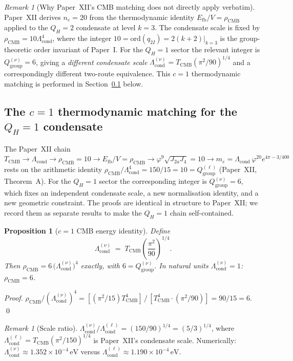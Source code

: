 \documentclass[11pt,a4paper]{article}
\newtheorem{proposition}[theorem]{Proposition}
\theoremstyle{definition}\newtheorem{definition}[theorem]{Definition}
\theoremstyle{remark}
\newtheorem{remark}[theorem]{Remark}
\newcommand{\vp}{\varphi}
\newcommand{\Ja}{J_{2a}}
\newcommand{\Jfour}{J_4}
\newcommand{\TCMB}{T_{\mathrm{CMB}}}
\newcommand{\Lcond}{\Lambda_{\mathrm{cond}}}
\newcommand{\rCMB}{\rho_{\mathrm{CMB}}}
\newcommand{\Efb}{E_{\mathrm{fb}}}
\newcommand{\QH}{Q_H}
\begin{document}
\begin{remark}[Why Paper~XII's CMB matching does not directly apply verbatim]
\label{P17:rem:cmb_fails}
Paper~XII derives $n_e=20$ from the thermodynamic identity
$\Efb/V=\rCMB$ applied to the $\QH=2$ condensate at level $k=3$.
The condensate scale is fixed by $\rCMB=10\Lcond^4$, where the integer
$10=\mathrm{ord}(q_{2I})=2(k+2)|_{k=3}$ is the group-theoretic order invariant of
Paper~I. For the $\QH=1$ sector the relevant integer is $Q_{\mathrm{group}}^{(\nu)}=6$,
giving a \emph{different condensate scale} $\Lcond^{(\nu)}=\TCMB(\pi^2/90)^{1/4}$
and a correspondingly different two-route equivalence.  This
$c=1$ thermodynamic matching is performed in
Section~\ref{P17:sec:nu_cmb_matching} below.
\end{remark}

\subsection{The $c=1$ thermodynamic matching for the $\QH=1$ condensate}
\label{P17:sec:nu_cmb_matching}

The Paper~XII chain
$\TCMB\to\Lcond\to\rCMB=10\to\Efb/V=\rCMB\to\vp^9\sqrt{\Ja\Jfour}=10
\to m_e=\Lcond\,\vp^{20}e^{4\pi-3/400}$
rests on the arithmetic identity $\rCMB/\Lcond^4=150/15=10=Q_{\mathrm{group}}^{(\ell)}$
(Paper~XII, Theorem~A).  For the $\QH=1$ sector the corresponding
integer is $Q_{\mathrm{group}}^{(\nu)}=6$, which fixes an independent
condensate scale, a new normalisation identity, and a new geometric
constraint.  The proofs are identical in structure to Paper~XII;
we record them as separate results to make the $\QH=1$ chain
self-contained.

\begin{proposition}[$c=1$ CMB energy identity]
\label{P17:prop:qh1_cmb}
Define
\begin{equation}
  \Lcond^{(\nu)} \;=\;
  \TCMB\!\left(\frac{\pi^2}{90}\right)^{\!1/4}.
  \label{P17:eq:Lcond_nu}
\end{equation}
Then $\rCMB = 6\,\bigl(\Lcond^{(\nu)}\bigr)^4$ exactly, with
$6=Q_{\mathrm{group}}^{(\nu)}$.  In natural units $\Lcond^{(\nu)}=1$:
$\rCMB=6$.
\end{proposition}

\begin{proof}
$\rCMB/(\Lcond^{(\nu)})^4 = [(\pi^2/15)\TCMB^4]\,/\,[\TCMB^4\cdot(\pi^2/90)]
= 90/15 = 6$.
\qed
\end{proof}

\begin{remark}[Scale ratio]
\label{P17:rem:scale_ratio}
$\Lcond^{(\nu)}/\Lcond^{(\ell)}=(150/90)^{1/4}=(5/3)^{1/4}$,
where $\Lcond^{(\ell)}=\TCMB(\pi^2/150)^{1/4}$ is Paper~XII's
condensate scale.  Numerically:
$\Lcond^{(\nu)}\approx1.352\times10^{-4}\,\mathrm{eV}$
versus $\Lcond^{(\ell)}\approx1.190\times10^{-4}\,\mathrm{eV}$.
\end{remark}
\end{document}
